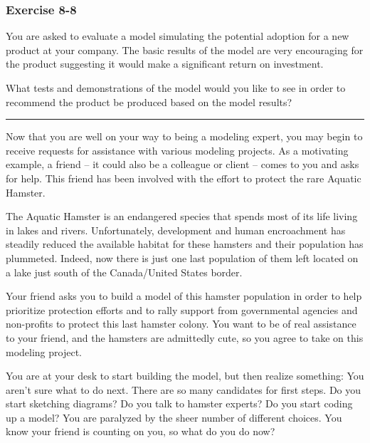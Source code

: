 \documentclass[]{memoir}
\begin{document}
\subsubsection{Exercise 8-8}

You are asked to evaluate a model simulating the potential adoption for
a new product at your company. The basic results of the model are very
encouraging for the product suggesting it would make a significant
return on investment.

What tests and demonstrations of the model would you like to see in
order to recommend the product be produced based on the model results?

\begin{center}\rule{3in}{0.4pt}\end{center}


Now that you are well on your way to being a modeling expert, you may
begin to receive requests for assistance with various modeling projects.
As a motivating example, a friend -- it could also be a colleague or
client -- comes to you and asks for help. This friend has been involved
with the effort to protect the rare Aquatic Hamster.

The Aquatic Hamster is an endangered species that spends most of its
life living in lakes and rivers. Unfortunately, development and human
encroachment has steadily reduced the available habitat for these
hamsters and their population has plummeted. Indeed, now there is just
one last population of them left located on a lake just south of the
Canada/United States border.

Your friend asks you to build a model of this hamster population in
order to help prioritize protection efforts and to rally support from
governmental agencies and non-profits to protect this last hamster
colony. You want to be of real assistance to your friend, and the
hamsters are admittedly cute, so you agree to take on this modeling
project.

You are at your desk to start building the model, but then realize
something: You aren't sure what to do next. There are so many candidates
for first steps. Do you start sketching diagrams? Do you talk to hamster
experts? Do you start coding up a model? You are paralyzed by the sheer
number of different choices. You know your friend is counting on you, so
what do you do now?
\end{document}

